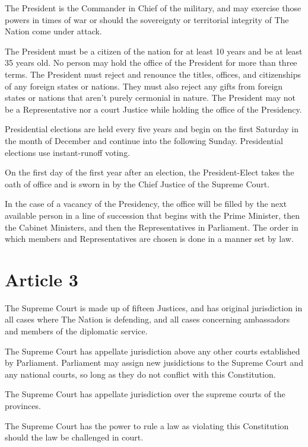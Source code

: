 \documentclass{report}
\newcommand{\nation}{The Nation}
\begin{document}
    The President is the Commander in Chief of the military, and may exercise
    those powers in times of war or should the sovereignty or territorial
    integrity of \nation{} come under attack.

    The President must be a citizen of the nation for at least 10 years and be
    at least 35 years old. No person may hold the office of the President for
    more than three terms. The President must reject and renounce the titles,
    offices, and citizenships of any foreign states or nations. They must also
    reject any gifts from foreign states or nations that aren't purely
    cermonial in nature. The President may not be a Representative nor a court
    Justice while holding the office of the Presidency.

    Presidential elections are held every five years and begin on the first
    Saturday in the month of December and continue into the following Sunday.
    Presidential elections use instant-runoff voting.

    On the first day of the first year after an election, the President-Elect
    takes the oath of office and is sworn in by the Chief Justice of the
    Supreme Court.

    In the case of a vacancy of the Presidency, the office will be filled by the
    next available person in a line of succession that begins with the Prime
    Minister, then the Cabinet Ministers, and then the Representatives in
    Parliament. The order in which members and Representatives are
    chosen is done in a manner set by law.

    \section{Article 3}

    The Supreme Court is made up of fifteen Justices, and has original
    jurisdiction in all cases where \nation{} is defending, and all cases
    concerning ambassadors and members of the diplomatic service.

    The Supreme Court has appellate jurisdiction above any other courts
    established by Parliament. Parliament may assign new jusidictions to the
    Supreme Court and any national courts, so long as they do not conflict with
    this Constitution.

    The Supreme Court has appellate jurisdiction over the supreme courts of the
    provinces.

    The Supreme Court has the power to rule a law as violating this Constitution
    should the law be challenged in court.
\end{document}
